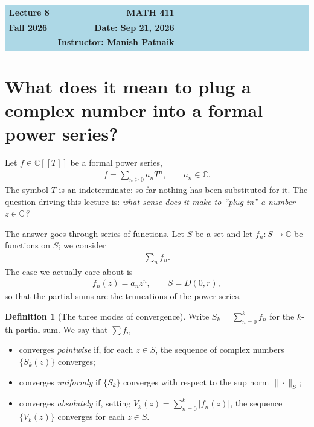 \documentclass[11pt]{article}
\theoremstyle{plain}
\theoremstyle{definition}
\newtheorem{definition}[theorem]{Definition}
\theoremstyle{remark}
\numberwithin{equation}{section}
\newcommand{\be}{\begin{eqnarray}}
\newcommand{\ee}{\end{eqnarray}}
\newcommand{\C}{\mathbb{C}}
\newcommand{\CT}{\C[[T]]}
\begin{document}
\begin{center}
  \colorbox{lightblue}{%
    \begin{minipage}{0.94\textwidth}
      \vspace{0.55em}
      \begin{tabular*}{\textwidth}{@{\extracolsep{\fill}}lr}
        {\color{courseblue}\bfseries\LARGE Lecture 8} &
        {\color{courseblue}\bfseries\LARGE MATH 411}\\[0.35em]
        \textbf{Fall 2026} & \textbf{Date: Sep 21, 2026}\\
        & \textbf{Instructor: Manish Patnaik}
      \end{tabular*}
      \vspace{0.45em}
    \end{minipage}}
\end{center}

\setcounter{tocdepth}{1}
\tableofcontents
\vspace{0.45em}

\section{What does it mean to plug a complex number into a formal power series?}

Let $f\in\CT$ be a formal power series,
\be
 f=\sum_{n\ge0}a_nT^n,\qquad a_n\in\C.
\ee
The symbol $T$ is an indeterminate: so far nothing has been substituted for
it. The question driving this lecture is: \emph{what sense does it make to
``plug in'' a number $z\in\C$?}

The answer goes through series of functions. Let $S$ be a set and let
$f_n\colon S\to\C$ be functions on $S$; we consider
\be
 \sum_{n} f_n.
\ee
The case we actually care about is
\be
 f_n(z)=a_nz^n,\qquad S=D(0,r),
\ee
so that the partial sums are the truncations of the power series.

\begin{definition}[The three modes of convergence]
Write $S_k=\sum_{n=0}^{k}f_n$ for the $k$-th partial sum. We say that
$\sum f_n$
\begin{itemize}
\item converges \emph{pointwise} if, for each $z\in S$, the sequence of
complex numbers $\{S_k(z)\}$ converges;
\item converges \emph{uniformly} if $\{S_k\}$ converges with respect to the
sup norm $\|\cdot\|_S$;
\item converges \emph{absolutely} if, setting
$\displaystyle V_k(z)=\sum_{n=0}^{k}|f_n(z)|$, the sequence $\{V_k(z)\}$
converges for each $z\in S$.

\end{itemize}
\end{definition}
\end{document}
